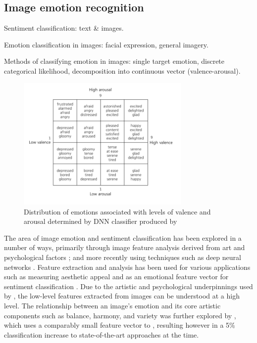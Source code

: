 \documentclass{article}
\begin{document}
\subsection{Image emotion recognition}
\begin{todolist}
	\item Sentiment classification: text \& images.
	\item Emotion classification in images: facial expression, general imagery.
	\item Methods of classifying emotion in images: single target emotion, discrete categorical likelihood, decomposition into continuous vector (valence-arousal).
\end{todolist}

\begin{figure}[h!]
	\centering
	\includegraphics[width=0.75\textwidth]{images/valence-arousal-grid.png}
	\caption{Distribution of emotions associated with levels of valence and arousal determined by DNN classifier produced by \citet{kim2018building}}
	\label{fig:valence-arousal}
\end{figure}

The area of image emotion and sentiment classification has been explored in a number of ways, primarily through image feature analysis derived from art and psychological factors \citep{machajdik2010affective}; and more recently using techniques such as deep neural networks \citep{chen2015learning, kim2018building}.
Feature extraction and analysis has been used for various applications such as measuring aesthetic appeal \citep{den2010using,den2010comparing,den2011evolving} and as an emotional feature vector for sentiment classification \citep{machajdik2010affective}.
Due to the artistic and psychological underpinnings used by \citet{machajdik2010affective}, the low-level features extracted from images can be understood at a high level.
The relationship between an image's emotion and its core artistic components such as balance, harmony, and variety was further explored by \citet{zhao2014exploring}, which uses a comparably small feature vector to \citet{machajdik2010affective}, resulting however in a 5\% classification increase to state-of-the-art approaches at the time.
\end{document}
